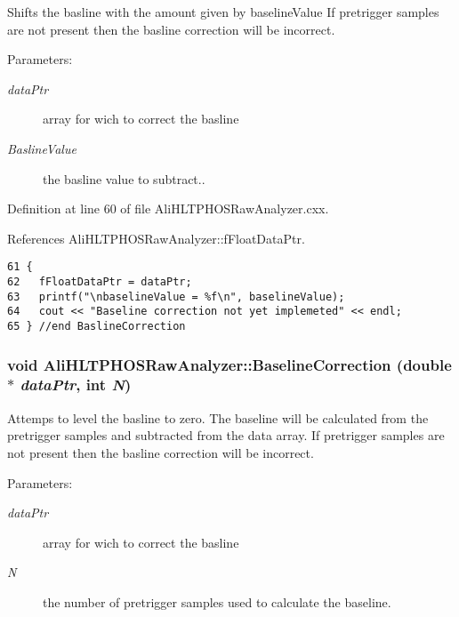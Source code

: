Shifts the basline with the amount given by baseline\-Value If pretrigger samples are not present then the basline correction will be incorrect. \begin{Desc}
\item[Parameters:]
\begin{description}
\item[{\em data\-Ptr}]array for wich to correct the basline \item[{\em Basline\-Value}]the basline value to subtract.. \end{description}
\end{Desc}


Definition at line 60 of file Ali\-HLTPHOSRaw\-Analyzer.cxx.

References Ali\-HLTPHOSRaw\-Analyzer::f\-Float\-Data\-Ptr.

\footnotesize\begin{verbatim}61 {
62   fFloatDataPtr = dataPtr;   
63   printf("\nbaselineValue = %f\n", baselineValue);
64   cout << "Baseline correction not yet implemeted" << endl;
65 } //end BaslineCorrection
\end{verbatim}\normalsize 


\subsubsection{\setlength{\rightskip}{0pt plus 5cm}void Ali\-HLTPHOSRaw\-Analyzer::Baseline\-Correction (double $\ast$ {\em data\-Ptr}, int {\em N})\hspace{0.3cm}{\tt  [inherited]}}\label{classAliHLTPHOSRawAnalyzer_AliHLTPHOSRawAnalyzerPeakFindera7}


Attemps to level the basline to zero. The baseline will be calculated from the pretrigger samples and subtracted from the data array. If pretrigger samples are not present then the basline correction will be incorrect. \begin{Desc}
\item[Parameters:]
\begin{description}
\item[{\em data\-Ptr}]array for wich to correct the basline \item[{\em N}]the number of pretrigger samples used to calculate the baseline. \end{description}
\end{Desc}


